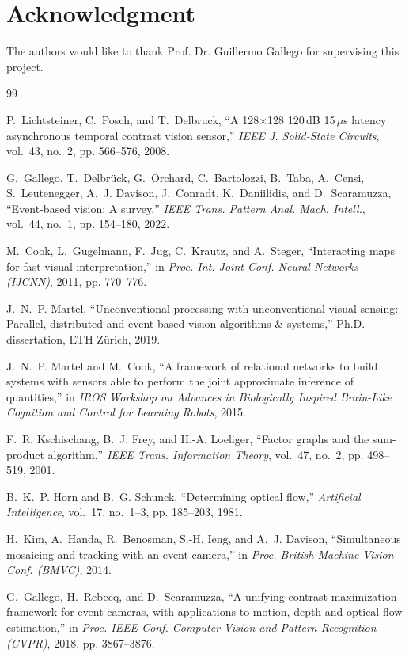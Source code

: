 \documentclass[journal]{IEEEtran}
\begin{document}
\section*{Acknowledgment}
The authors would like to thank Prof. Dr. Guillermo Gallego for supervising this
project.


\begin{thebibliography}{99}

P.~Lichtsteiner, C.~Posch, and T.~Delbruck, ``A 128$\times$128 120\,dB
15\,$\mu$s latency asynchronous temporal contrast vision sensor,''
\emph{IEEE J. Solid-State Circuits}, vol.~43, no.~2, pp. 566--576, 2008.

G.~Gallego, T.~Delbr\"uck, G.~Orchard, C.~Bartolozzi, B.~Taba, A.~Censi,
S.~Leutenegger, A.~J. Davison, J.~Conradt, K.~Daniilidis, and D.~Scaramuzza,
``Event-based vision: A survey,'' \emph{IEEE Trans. Pattern Anal. Mach.
Intell.}, vol.~44, no.~1, pp. 154--180, 2022.

M.~Cook, L.~Gugelmann, F.~Jug, C.~Krautz, and A.~Steger, ``Interacting maps for
fast visual interpretation,'' in \emph{Proc. Int. Joint Conf. Neural Networks
(IJCNN)}, 2011, pp. 770--776.

J.~N.~P. Martel, ``Unconventional processing with unconventional visual sensing:
Parallel, distributed and event based vision algorithms \& systems,'' Ph.D.
dissertation, ETH Z\"urich, 2019.

J.~N.~P. Martel and M.~Cook, ``A framework of relational networks to build
systems with sensors able to perform the joint approximate inference of
quantities,'' in \emph{IROS Workshop on Advances in Biologically Inspired
Brain-Like Cognition and Control for Learning Robots}, 2015.

F.~R. Kschischang, B.~J. Frey, and H.-A. Loeliger, ``Factor graphs and the
sum-product algorithm,'' \emph{IEEE Trans. Information Theory}, vol.~47, no.~2,
pp. 498--519, 2001.

B.~K.~P. Horn and B.~G. Schunck, ``Determining optical flow,'' \emph{Artificial
Intelligence}, vol.~17, no.~1--3, pp. 185--203, 1981.

H.~Kim, A.~Handa, R.~Benosman, S.-H. Ieng, and A.~J. Davison, ``Simultaneous
mosaicing and tracking with an event camera,'' in \emph{Proc. British Machine
Vision Conf. (BMVC)}, 2014.

G.~Gallego, H.~Rebecq, and D.~Scaramuzza, ``A unifying contrast maximization
framework for event cameras, with applications to motion, depth and optical flow
estimation,'' in \emph{Proc. IEEE Conf. Computer Vision and Pattern Recognition
(CVPR)}, 2018, pp. 3867--3876.


\end{thebibliography}
\end{document}
